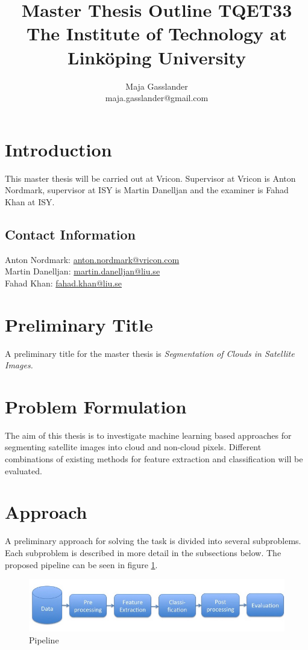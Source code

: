 \documentclass{article}
\title{Master Thesis Outline TQET33 \\
\normalsize{The Institute of Technology at Linköping University}}
\author{Maja Gasslander \\ \normalsize{maja.gasslander@gmail.com}}
\begin{document}
\maketitle
\newpage
\section{Introduction}
This master thesis will be carried out at Vricon. Supervisor at Vricon is Anton Nordmark, supervisor at ISY is Martin Danelljan and the examiner is Fahad Khan at ISY. 

\subsection{Contact Information}
Anton Nordmark: \href{mailto:anton.nordmark@vricon.com}{anton.nordmark@vricon.com}\\
Martin Danelljan: \href{mailto:martin.danelljan@liu.se}{martin.danelljan@liu.se} \\
Fahad Khan: \href{mailto:fahad.khan@liu.se}{fahad.khan@liu.se}


\section{Preliminary Title}
A preliminary title for the master thesis is \emph{Segmentation of Clouds in Satellite Images.} 

\section{Problem Formulation}
The aim of this thesis is to investigate machine learning based approaches for segmenting satellite images into cloud and non-cloud pixels. Different combinations of existing methods for feature extraction and classification will be evaluated.
\section{Approach}
A preliminary approach for solving the task is divided into several subproblems. Each subproblem is described in more detail in the subsections below. The proposed pipeline can be seen in figure \ref{fig:pipeline}.

\begin{figure}[h!]
    \centering
    \includegraphics[scale=0.5]{fig/pipeline}
    \caption{Pipeline}
    \label{fig:pipeline}
\end{figure}
\end{document}
